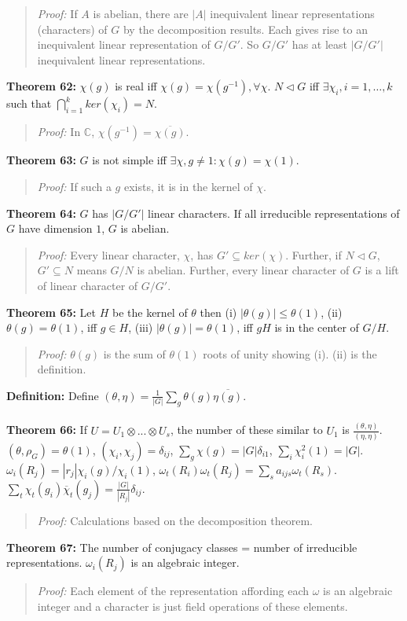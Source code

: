 {\begin{quote}
\emph{Proof:}  
If $A$ is abelian, there are $|A|$ inequivalent linear representations (characters) of $G$
by the decomposition results.  Each gives rise to an inequivalent linear representation of $G/G'$.
So $G/G'$ has at least $|G/G'|$ inequivalent linear representations.
\end{quote}
{\bf Theorem 62:}
$\chi(g)$ is real iff
$\chi(g)= \chi(g^{-1}), \forall \chi$.  $N \lhd G$ iff $\exists \chi_i, i= 1, \ldots, k$
such that $\bigcap_{i=1}^k ker(\chi_i)=N$.
\begin{quote}
\emph{Proof:}  
In ${\mathbb C}$, $\chi(g^{-1}) = {\overline {\chi(g)}}$.
\end{quote}
{\bf Theorem 63:}
$G$ is not simple iff $\exists \chi, g \ne 1:
\chi(g)= \chi(1)$.
\begin{quote}
\emph{Proof:}  
If such a $g$ exists, it is in the kernel of $\chi$.
\end{quote}
{\bf Theorem 64:}
$G$ has $|G/G'|$ linear characters.
If all irreducible representations of $G$ have dimension $1$, $G$ is abelian.
\begin{quote}
\emph{Proof:}  
Every linear character, $\chi$, has $G' \subseteq ker(\chi)$.  Further, if $N \lhd G$,
$G' \subseteq N$ means $G/N$ is abelian.  Further, every linear character of $G$ is a
lift of linear character of $G/G'$.
\end{quote}
{\bf Theorem 65:}
Let $H$ be the kernel of $\theta$ then (i) $|\theta(g)| \leq \theta(1)$,
(ii) $\theta(g) = \theta(1)$, iff $g \in H$,
(iii) $|\theta(g)| = \theta(1)$, iff $gH$ is in the center of $G/H$.
\begin{quote}
\emph{Proof:}  
$\theta(g)$ is the sum of $\theta(1)$ roots of unity showing (i).
(ii) is the definition.
\end{quote}
{\bf Definition:}
Define $(\theta , \eta)= {\frac 1 {|G|}} \sum_g \theta(g) {\overline {\eta(g)}}$.
\\
\\
{\bf Theorem 66:}
If $U = U_{1} \otimes ... \otimes U_{s}$, the number of these similar to $U_{1}$
is ${\frac {(\theta, \eta)} {(\eta, \eta)}}$.
$(\theta, \rho_{G})= \theta(1)$,
$(\chi_{i}, \chi_{j})= \delta_{ij}$,
$\sum_{g} \chi(g) = |G| \delta_{i1}$,
$\sum_{i} \chi_{i}^{2}(1) = |G| $.
$\omega_{i}(R_{j})= |r_{j}|\chi_{i}(g)/\chi_{i}(1)$,
$\omega_{t}(R_{i}) \omega_{t}(R_{j})= \sum_{s} a_{ijs} \omega_{t}(R_{s})$.
$\sum_{t} \chi_{t}(g_{i}) {\overline \chi_{t}(g_{j})} =
{\frac {|G|}{|R_{j}|}} \delta_{ij}$.
\begin{quote}
\emph{Proof:}  
Calculations based on the decomposition theorem.
\end{quote}
{\bf Theorem 67:}
The number of conjugacy classes = number of irreducible representations.
$\omega_{i}(R_{j})$ is an algebraic integer.
\begin{quote}
\emph{Proof:}  
Each element of the representation affording each $\omega$ is an algebraic integer and a
character is just field operations of these elements.
\end{quote}
}
